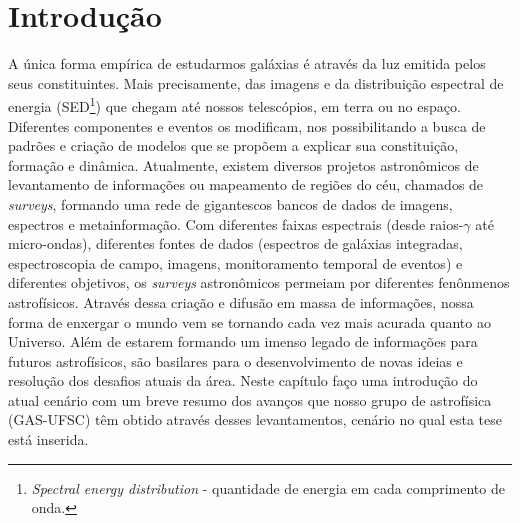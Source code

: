 



\chapter{Introdução}
\label{sec:intro}

A única forma empírica de estudarmos galáxias é através da luz emitida pelos seus constituintes. Mais precisamente, das imagens e da distribuição espectral de energia (SED\footnote{{\em Spectral energy distribution} - quantidade de energia em cada comprimento de onda.}) que chegam até nossos telescópios, em terra ou no espaço. Diferentes componentes e eventos os modificam, nos possibilitando a busca de padrões e criação de modelos que se propõem a explicar sua constituição, formação e dinâmica. Atualmente, existem diversos projetos astronômicos de levantamento de informações ou mapeamento de regiões do céu, chamados de {\em surveys}, formando uma rede de gigantescos bancos de dados de imagens, espectros e metainformação. Com diferentes faixas espectrais (desde raios-$\gamma$ até micro-ondas), diferentes fontes de dados (espectros de galáxias integradas, espectroscopia de campo, imagens, monitoramento temporal de eventos) e diferentes objetivos, os {\em surveys} astronômicos permeiam por diferentes fenônmenos astrofísicos. Através dessa criação e difusão em massa de informações, nossa forma de enxergar o mundo vem se tornando cada vez mais acurada quanto ao Universo. Além de estarem formando um imenso legado de informações para futuros astrofísicos, são basilares para o desenvolvimento de novas ideias e resolução dos desafios atuais da área. Neste capítulo faço uma introdução do atual cenário com um breve resumo dos avanços que nosso grupo de astrofísica (GAS-UFSC) têm obtido através desses levantamentos, cenário no qual esta tese está inserida.


